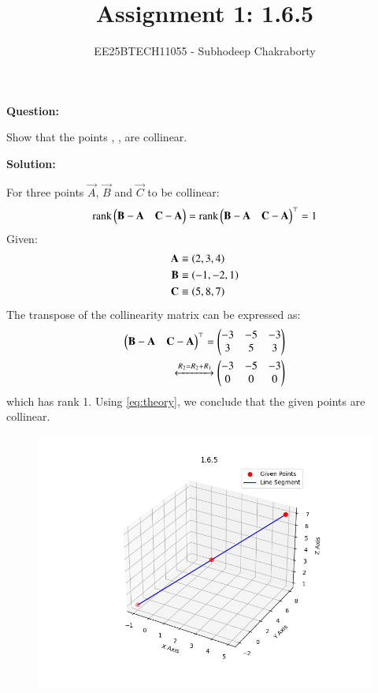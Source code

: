\documentclass[journal,12pt,onecolumn]{IEEEtran}
\theoremstyle{remark}
\begin{document}

\vspace{3cm}

\title{Assignment 1: 1.6.5}
\author{EE25BTECH11055 - Subhodeep Chakraborty}
\maketitle
\hrulefill
\bigskip

\renewcommand{\thefigure}{\theenumi}
\renewcommand{\thetable}{\theenumi}

\textbf{Question:}\par
Show that the points , ,  are collinear.\par
\textbf{Solution:}\par
For three points $\vec{A}$, $\vec{B}$ and $\vec{C}$ to be collinear:
\begin{align}
    \label{eq:theory}
    \text{rank}\begin{pmatrix}\mathbf{B-A} & \mathbf{C-A}\end{pmatrix} = \text{rank}\begin{pmatrix}\mathbf{B-A} & \mathbf{C-A}\end{pmatrix}^\top = 1
\end{align}
Given:
\begin{align}
 \mathbf{A} &\equiv \left(2, 3, 4\right) \\
 \mathbf{B} &\equiv \left(-1, -2, 1\right) \\
 \mathbf{C} &\equiv \left(5, 8, 7\right)
\end{align}
The transpose of the collinearity matrix can be expressed as:
\begin{align}
 \begin{pmatrix}\mathbf{B-A} & \mathbf{C-A}\end{pmatrix}^\top = \begin{pmatrix}-3 & -5 & -3 \\ 3 & 5 & 3\end{pmatrix} \\
 \xleftrightarrow[]{R_2 = R_2 + R_1}
 \begin{pmatrix}-3 & -5 & -3 \\ 0 & 0 & 0\end{pmatrix}
\end{align}
which has rank 1. Using \ref{eq:theory}, we conclude that the given points are collinear.
\begin{figure}[H]
    \centering
    \includegraphics{figs/plot.png}
    \caption*{}
    \label{fig:plot}
\end{figure}
\end{document}

